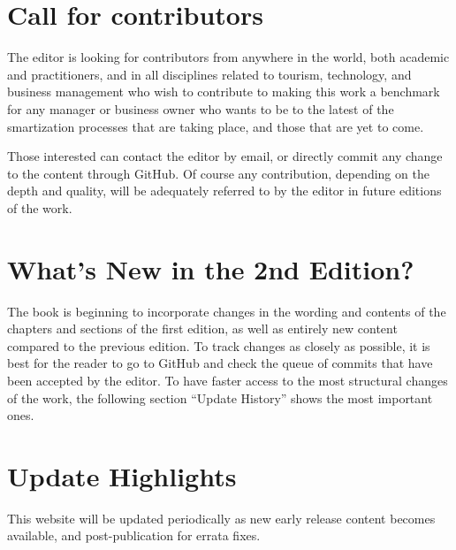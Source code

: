 \documentclass[
  letterpaper,
  DIV=11,
  numbers=noendperiod]{scrreprt}
\begin{document}
\hypertarget{call-for-contributors}{%
\section*{Call for contributors}\label{call-for-contributors}}


The editor is looking for contributors from anywhere in the world, both
academic and practitioners, and in all disciplines related to tourism,
technology, and business management who wish to contribute to making
this work a benchmark for any manager or business owner who wants to be
to the latest of the smartization processes that are taking place, and
those that are yet to come.

Those interested can contact the editor by email, or directly commit any
change to the content through GitHub. Of course any contribution,
depending on the depth and quality, will be adequately referred to by
the editor in future editions of the work.

\hypertarget{whats-new-in-the-2nd-edition}{%
\section*{What's New in the 2nd
Edition?}\label{whats-new-in-the-2nd-edition}}


The book is beginning to incorporate changes in the wording and contents
of the chapters and sections of the first edition, as well as entirely
new content compared to the previous edition. To track changes as
closely as possible, it is best for the reader to go to GitHub and check
the queue of commits that have been accepted by the editor. To have
faster access to the most structural changes of the work, the following
section ``Update History'' shows the most important ones.

\hypertarget{update-highlights}{%
\section*{Update Highlights}\label{update-highlights}}


This website will be updated periodically as new early release content
becomes available, and post-publication for errata fixes.
\end{document}
